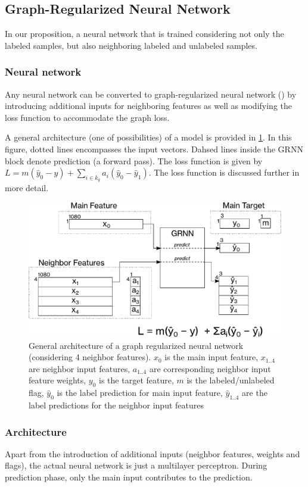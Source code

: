 \documentclass[applsci,article,submit,moreauthors,pdftex]{Definitions/mdpi}
\begin{document}
\subsection{Graph-Regularized Neural Network}

In our proposition, a neural network that is trained considering not only the labeled samples, but also neighboring labeled and unlabeled samples.

\subsubsection{Neural network}

Any neural network can be converted to graph-regularized neural network (\grnn) by introducing additional inputs for neighboring features as well as modifying the loss function to accommodate the graph loss.

A general architecture (one of possibilities) of a \grnn model is provided in \figurename{} \ref{fig:networktraining}. In this figure, dotted lines encompasses the input vectors. Dahsed lines inside the GRNN block denote prediction (a forward pass). The loss function is given by $ L = m(\hat{y}_0-y) + \sum_{i \in k_g}a_i(\hat{y}_0 - \hat{y}_1) $. The loss function is discussed further in more detail.

\begin{figure}
	\centering
	\includegraphics[width=0.5\linewidth]{img/network_training}
	\caption{General architecture of a graph regularized neural network (considering 4 neighbor features). $ x_0 $ is the main input feature, $ x_{1..4} $ are neighbor input features, $ a_{1..4} $ are corresponding neighbor input feature weights, $ y_0 $ is the target feature, $ m $ is the labeled/unlabeled flag, $ \hat{y}_0 $ is the label prediction for main input feature, $ \hat{y}_{1..4} $ are the label predictions for the neighbor input features}
	\label{fig:networktraining}
\end{figure}


\subsubsection{Architecture}
Apart from the introduction of additional inputs (neighbor features, weights and flags), the actual neural network is just a multilayer perceptron. During prediction phase, only the main input contributes to the prediction.
\end{document}
